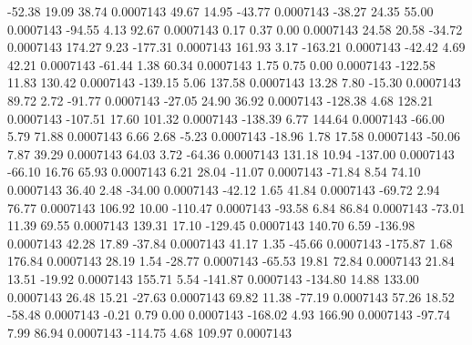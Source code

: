       -52.38       19.09       38.74     0.0007143
       49.67       14.95      -43.77     0.0007143
      -38.27       24.35       55.00     0.0007143
      -94.55        4.13       92.67     0.0007143
        0.17        0.37        0.00     0.0007143
       24.58       20.58      -34.72     0.0007143
      174.27        9.23     -177.31     0.0007143
      161.93        3.17     -163.21     0.0007143
      -42.42        4.69       42.21     0.0007143
      -61.44        1.38       60.34     0.0007143
        1.75        0.75        0.00     0.0007143
     -122.58       11.83      130.42     0.0007143
     -139.15        5.06      137.58     0.0007143
       13.28        7.80      -15.30     0.0007143
       89.72        2.72      -91.77     0.0007143
      -27.05       24.90       36.92     0.0007143
     -128.38        4.68      128.21     0.0007143
     -107.51       17.60      101.32     0.0007143
     -138.39        6.77      144.64     0.0007143
      -66.00        5.79       71.88     0.0007143
        6.66        2.68       -5.23     0.0007143
      -18.96        1.78       17.58     0.0007143
      -50.06        7.87       39.29     0.0007143
       64.03        3.72      -64.36     0.0007143
      131.18       10.94     -137.00     0.0007143
      -66.10       16.76       65.93     0.0007143
        6.21       28.04      -11.07     0.0007143
      -71.84        8.54       74.10     0.0007143
       36.40        2.48      -34.00     0.0007143
      -42.12        1.65       41.84     0.0007143
      -69.72        2.94       76.77     0.0007143
      106.92       10.00     -110.47     0.0007143
      -93.58        6.84       86.84     0.0007143
      -73.01       11.39       69.55     0.0007143
      139.31       17.10     -129.45     0.0007143
      140.70        6.59     -136.98     0.0007143
       42.28       17.89      -37.84     0.0007143
       41.17        1.35      -45.66     0.0007143
     -175.87        1.68      176.84     0.0007143
       28.19        1.54      -28.77     0.0007143
      -65.53       19.81       72.84     0.0007143
       21.84       13.51      -19.92     0.0007143
      155.71        5.54     -141.87     0.0007143
     -134.80       14.88      133.00     0.0007143
       26.48       15.21      -27.63     0.0007143
       69.82       11.38      -77.19     0.0007143
       57.26       18.52      -58.48     0.0007143
       -0.21        0.79        0.00     0.0007143
     -168.02        4.93      166.90     0.0007143
      -97.74        7.99       86.94     0.0007143
     -114.75        4.68      109.97     0.0007143
